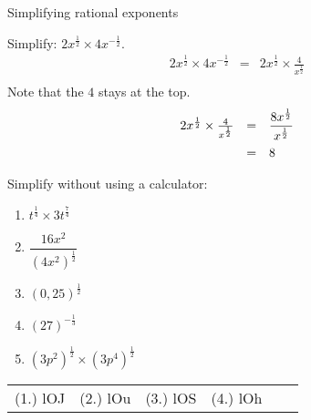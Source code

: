 \begin{wex}
{%
Simplifying rational exponents
}

{
Simplify:
$ 2x^{\frac{1}{2}}\times 4x^{-\frac{1}{2}}. $
}
{%
\begin{eqnarray*}
 2x^{\frac{1}{2}} \times 4x^{-\frac{1}{2}} & = & 2x^{\frac{1}{2}} \times \frac{4}{x^{\frac{1}{2}}} \\
\end{eqnarray*}
Note that the $4$ stays at the top.\\

\begin{equation*}
 \begin{array}{rcl}
 2x^{\frac{1}{2}} \times \frac{4}{x^{\frac{1}{2}}} & = & \dfrac{8x^{\frac{1}{2}}}{x^{\frac{1}{2}}} \vspace{5pt} \\
					     & = & 8 
 \end{array}
\end{equation*}
}
\end{wex}

\begin{exercises}{}{
Simplify without using a calculator:
\begin{multicols}{2}
\begin{enumerate}[label=\textbf{\arabic*}., itemsep=5pt]
 \item $ t^{\frac{1}{4}} \times 3t^{\frac{7}{4}} $
 \item $ \dfrac{16x^2}{(4x^2)^{\frac{1}{2}}} $
 \item $ (0,25)^{\frac{1}{2}} $
 \item $ (27)^{-\frac{1}{3}} $
 \item $ (3p^2)^{\frac{1}{2}} \times (3p^4)^{\frac{1}{2}} $
\end{enumerate}
\end{multicols}
\practiceinfo
\par \practiceinfo
\begin{tabular}[h]{cccccc}
(1.) lOJ  &  (2.) lOu  &  (3.) lOS  &  (4.) lOh  & 
\end{tabular}
}
\end{exercises}




